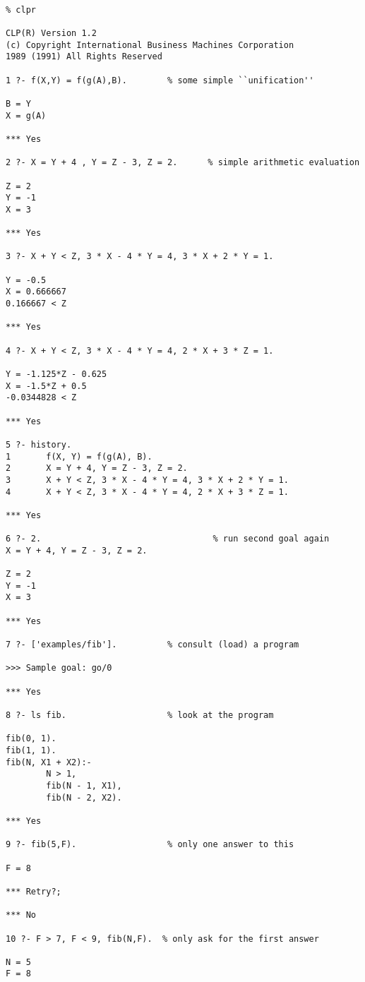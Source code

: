 \begin{verbatim}

% clpr

CLP(R) Version 1.2
(c) Copyright International Business Machines Corporation
1989 (1991) All Rights Reserved

1 ?- f(X,Y) = f(g(A),B).        % some simple ``unification''

B = Y
X = g(A)

*** Yes

2 ?- X = Y + 4 , Y = Z - 3, Z = 2.      % simple arithmetic evaluation

Z = 2
Y = -1
X = 3

*** Yes

3 ?- X + Y < Z, 3 * X - 4 * Y = 4, 3 * X + 2 * Y = 1.

Y = -0.5
X = 0.666667
0.166667 < Z

*** Yes

4 ?- X + Y < Z, 3 * X - 4 * Y = 4, 2 * X + 3 * Z = 1.

Y = -1.125*Z - 0.625
X = -1.5*Z + 0.5
-0.0344828 < Z

*** Yes

5 ?- history.
1       f(X, Y) = f(g(A), B).
2       X = Y + 4, Y = Z - 3, Z = 2.
3       X + Y < Z, 3 * X - 4 * Y = 4, 3 * X + 2 * Y = 1.
4       X + Y < Z, 3 * X - 4 * Y = 4, 2 * X + 3 * Z = 1.

*** Yes

6 ?- 2.                                  % run second goal again 
X = Y + 4, Y = Z - 3, Z = 2.

Z = 2
Y = -1
X = 3

*** Yes

7 ?- ['examples/fib'].          % consult (load) a program

>>> Sample goal: go/0

*** Yes

8 ?- ls fib.                    % look at the program

fib(0, 1).
fib(1, 1).
fib(N, X1 + X2):-
        N > 1,
        fib(N - 1, X1),
        fib(N - 2, X2).

*** Yes

9 ?- fib(5,F).                  % only one answer to this

F = 8

*** Retry?;

*** No

10 ?- F > 7, F < 9, fib(N,F).  % only ask for the first answer

N = 5
F = 8


\end{verbatim}
